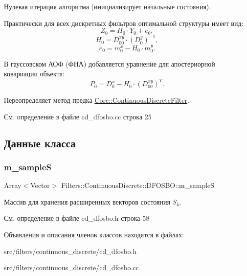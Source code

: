 Нулевая итерация алгоритма (инициализирует начальные состояния). 

Практически для всех дискретных фильтров оптимальной структуры имеет вид\+: \[Z_0 = H_0 \cdot Y_0 + e_0,\] \[H_0 = D_{00}^{xy} \cdot (D_0^y)^{-1},\] \[e_0 = m_0^x - H_0 \cdot m_0^y.\]

В гауссовском АОФ (ФНА) добавляется уравнение для апостериорной ковариации объекта\+: \[P_0 = D_0^x - H_0 \cdot (D_{00}^{xy})^T.\] 

Переопределяет метод предка \hyperlink{class_core_1_1_continuous_discrete_filter_acc9b18241a13d46dc92ef1f02ec13e53}{Core\+::\+Continuous\+Discrete\+Filter}.



См. определение в файле cd\+\_\+dfosbo.\+cc строка 25



\subsection{Данные класса}
\hypertarget{class_filters_1_1_continuous_discrete_1_1_d_f_o_s_b_o_affccb91872f23878db490d487c481606}{}\label{class_filters_1_1_continuous_discrete_1_1_d_f_o_s_b_o_affccb91872f23878db490d487c481606} 
\subsubsection{\texorpdfstring{m\+\_\+sampleS}{m\_sampleS}}
{\footnotesize\ttfamily Array$<$Vector$>$ Filters\+::\+Continuous\+Discrete\+::\+D\+F\+O\+S\+B\+O\+::m\+\_\+sampleS\hspace{0.3cm}{\ttfamily [protected]}}

Массив для хранения расширенных векторов состояния $S_k$. 

См. определение в файле cd\+\_\+dfosbo.\+h строка 58



Объявления и описания членов классов находятся в файлах\+:\begin{DoxyCompactItemize}
\item 
src/filters/continuous\+\_\+discrete/cd\+\_\+dfosbo.\+h\item 
src/filters/continuous\+\_\+discrete/cd\+\_\+dfosbo.\+cc\end{DoxyCompactItemize}

